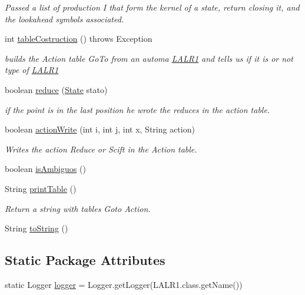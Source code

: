 \begin{DoxyCompactItemize}
\begin{DoxyCompactList}\small\item\em Passed a list of production I that form the kernel of a state, return closing it, and the lookahead symbols associated. \end{DoxyCompactList}\item 
int \hyperlink{classcontext_free_1_1parser_1_1_l_a_l_r1_a79576626b3b59b832faecc986b293b36}{table\-Costruction} ()  throws Exception
\begin{DoxyCompactList}\small\item\em builds the Action table Go\-To from an automa \hyperlink{classcontext_free_1_1parser_1_1_l_a_l_r1}{L\-A\-L\-R1} and tells us if it is or not type of \hyperlink{classcontext_free_1_1parser_1_1_l_a_l_r1}{L\-A\-L\-R1} \end{DoxyCompactList}\item 
boolean \hyperlink{classcontext_free_1_1parser_1_1_l_a_l_r1_a2281981b3043c0150c1b3d3967572b1f}{reduce} (\hyperlink{classcontext_free_1_1parser_1_1_state}{State} stato)
\begin{DoxyCompactList}\small\item\em if the point is in the last position he wrote the reduces in the action table. \end{DoxyCompactList}\item 
boolean \hyperlink{classcontext_free_1_1parser_1_1_l_a_l_r1_a7379103379c94e377daca0022b28771e}{action\-Write} (int i, int j, int x, String action)
\begin{DoxyCompactList}\small\item\em Writes the action Reduce or Scift in the Action table. \end{DoxyCompactList}\item 
boolean \hyperlink{classcontext_free_1_1parser_1_1_l_a_l_r1_a9c19be71fc16e04343eb3c23b6eac9da}{is\-Ambiguos} ()
\item 
String \hyperlink{classcontext_free_1_1parser_1_1_l_a_l_r1_ad7628eb817b4a8efff71f6e22cc1659f}{print\-Table} ()
\begin{DoxyCompactList}\small\item\em Return a string with tables Goto Action. \end{DoxyCompactList}\item 
String \hyperlink{classcontext_free_1_1parser_1_1_l_a_l_r1_afa3cc07b08ecbe69486105beb311eb69}{to\-String} ()
\end{DoxyCompactItemize}
\subsection*{Static Package Attributes}
\begin{DoxyCompactItemize}
\item 
static Logger \hyperlink{classcontext_free_1_1parser_1_1_l_a_l_r1_a9684757c9b143a5b82609c1de472400e}{logger} = Logger.\-get\-Logger(L\-A\-L\-R1.\-class.\-get\-Name())
\end{DoxyCompactItemize}
